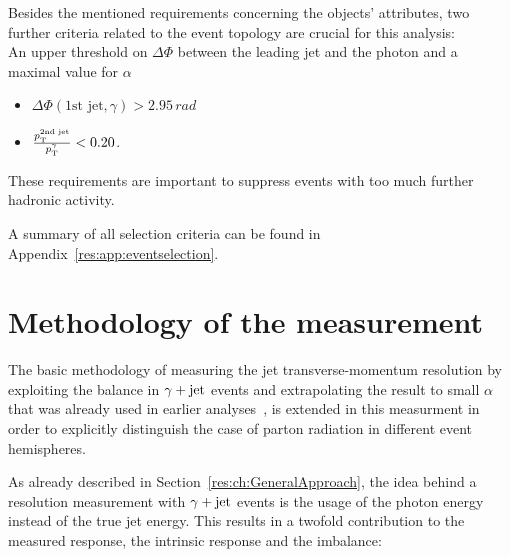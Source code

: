 Besides the mentioned requirements concerning the objects' attributes, two further criteria related to the event topology are crucial for this analysis:\\
An upper threshold on $\Delta \Phi$ between the leading jet and the photon and a maximal value for $\alpha$
\begin{itemize}
 \item $\Delta \Phi \left(\text{1st jet}, \gamma \right) > 2.95\,\unit{rad}$
 \item $\frac{p_{\text{T}}^{\text{2nd jet}}}{p_{\text{T}}^{\gamma}} < 0.20$.
\end{itemize}
These requirements are important to suppress events with too much further hadronic activity.

A summary of all selection criteria can be found in Appendix~\ref{res:app:eventselection}.

\FloatBarrier
\chapter{Methodology of the measurement}

The basic methodology of measuring the jet transverse-momentum resolution by exploiting the \pt balance in $\gamma + \text{jet}$ events and extrapolating the result to small $\alpha$ that was already used in earlier analyses~\cite{bib:CMS:JERCPaper_2011}, 
is extended in this measurment in order to explicitly distinguish the case of parton radiation in different event hemispheres.

As already described in Section~\ref{res:ch:GeneralApproach}, the idea behind a resolution measurement with $\gamma + \text{jet}$ events is the usage of the photon energy instead of the true jet energy.
This results in a twofold contribution to the measured response, the intrinsic response and the imbalance:

